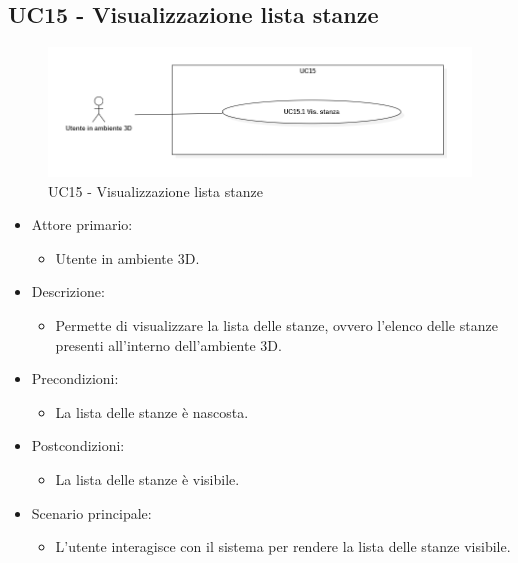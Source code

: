 \pagebreak

\subsection{UC15 - Visualizzazione lista stanze}

\begin{figure}[H]
  \renewcommand{\thefigure}{18}
  \includegraphics[width=\linewidth]{./res/images/UC15.png}
  \caption{UC15 - Visualizzazione lista stanze}
  \label{fig:UC 15}
\end{figure}

\begin{itemize}

	\item Attore primario: 
	\begin{itemize}
		\item Utente in ambiente 3D.
	\end{itemize}
	\item Descrizione:
	\begin{itemize}
		\item Permette di visualizzare la lista delle stanze, ovvero l'elenco delle stanze presenti all'interno dell'ambiente 3D.
	\end{itemize}
	
	\item Precondizioni:
	\begin{itemize}
		\item La lista delle stanze è nascosta.
	\end{itemize}
	
	\item Postcondizioni:
	\begin{itemize}
		\item La lista delle stanze è visibile.
	\end{itemize}
	
	\item Scenario principale:
	\begin{itemize}
		\item L'utente interagisce con il sistema per rendere la lista delle stanze visibile.
	\end{itemize}
	
\end{itemize}


